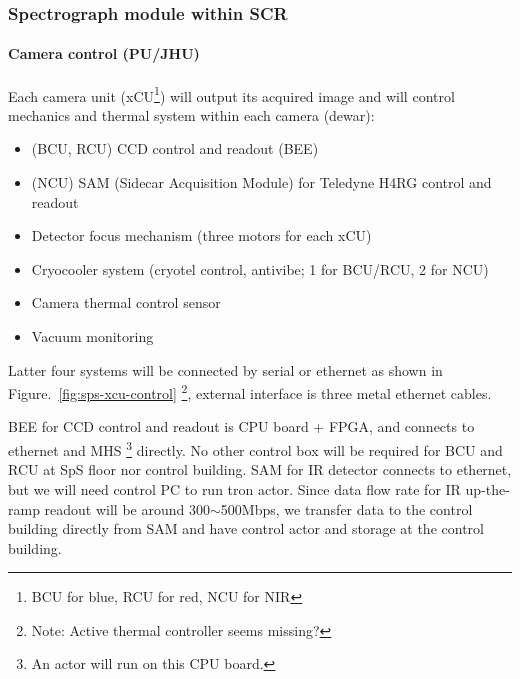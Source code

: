 \documentclass[a4paper,notitlepage]{article}
\begin{document}
\subsubsection{Spectrograph module within SCR}

\paragraph{Camera control (PU/JHU)}

Each camera unit (xCU\footnote{BCU for blue, RCU for red, NCU for NIR}) 
will output its acquired image and will control 
mechanics and thermal system within each camera (dewar): 

\begin{itemize}
  \item (BCU, RCU) CCD control and readout (BEE)
  \item (NCU) SAM (Sidecar Acquisition Module) for Teledyne H4RG control and readout
  \item Detector focus mechanism (three motors for each xCU)
  \item Cryocooler system (cryotel control, antivibe; 1 for BCU/RCU, 2 for NCU)
  \item Camera thermal control sensor
  \item Vacuum monitoring
\end{itemize}

Latter four systems will be connected by serial or ethernet as shown in 
Figure.~\ref{fig:sps-xcu-control}
\footnote{Note: Active thermal controller seems missing?}, 
external interface is three metal ethernet cables. 

BEE for CCD control and readout is CPU board + FPGA, and connects to 
ethernet and MHS \footnote{An actor will run on this CPU board.} directly. 
No other control box will be required for BCU and RCU at SpS floor nor 
control building. 
SAM for IR detector connects to ethernet, but we will need control PC 
to run tron actor. Since data flow rate for IR up-the-ramp readout will be 
around 300$\sim$500Mbps, we transfer data to the control building directly 
from SAM and have control actor and storage at the control building. 
\end{document}
